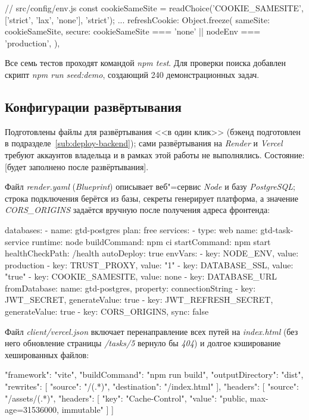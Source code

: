 \documentclass{stp}
\newcommand{\en}[1]{\textit{#1}}
\begin{document}
\begin{stplisting}
// src/config/env.js
const cookieSameSite =
  readChoice('COOKIE_SAMESITE',
    ['strict', 'lax', 'none'], 'strict');
...
refreshCookie: Object.freeze({
  sameSite: cookieSameSite,
  secure: cookieSameSite === 'none' || nodeEnv === 'production',
}),
\end{stplisting}

Все семь тестов проходят командой \en{npm test}. Для проверки поиска
добавлен скрипт \en{npm run seed:demo}, создающий 240 демонстрационных
задач.

\subsection{Конфигурации развёртывания}\label{sub:deploy}

Подготовлены файлы для развёртывания <<в один клик>> (бэкенд подготовлен в подразделе~\ref{sub:deploy-backend}); сами развёртывания
на \en{Render} и \en{Vercel} требуют аккаунтов владельца и в рамках этой
работы не выполнялись. Состояние: [будет заполнено после развёртывания].

Файл \en{render.yaml} (\en{Blueprint}) описывает веб"=сервис \en{Node} и
базу \en{PostgreSQL}; строка подключения берётся из базы, секреты
генерирует платформа, а значение \en{CORS\_ORIGINS} задаётся вручную после
получения адреса фронтенда:

\begin{stplisting}
databases:
  - name: gtd-postgres
    plan: free
services:
  - type: web
    name: gtd-task-service
    runtime: node
    buildCommand: npm ci
    startCommand: npm start
    healthCheckPath: /health
    autoDeploy: true
    envVars:
      - { key: NODE_ENV, value: production }
      - { key: TRUST_PROXY, value: "1" }
      - { key: DATABASE_SSL, value: "true" }
      - { key: COOKIE_SAMESITE, value: none }
      - key: DATABASE_URL
        fromDatabase: { name: gtd-postgres,
                        property: connectionString }
      - { key: JWT_SECRET, generateValue: true }
      - { key: JWT_REFRESH_SECRET, generateValue: true }
      - { key: CORS_ORIGINS, sync: false }
\end{stplisting}

Файл \en{client/vercel.json} включает перенаправление всех путей на
\en{index.html} (без него обновление страницы \en{/tasks/5} вернуло бы
\en{404}) и долгое кэширование хешированных файлов:

\begin{stplisting}
{
  "framework": "vite",
  "buildCommand": "npm run build",
  "outputDirectory": "dist",
  "rewrites": [{ "source": "/(.*)", "destination": "/index.html" }],
  "headers": [{ "source": "/assets/(.*)", "headers": [
    { "key": "Cache-Control",
      "value": "public, max-age=31536000, immutable" }] }]
}
\end{stplisting}
\end{document}
